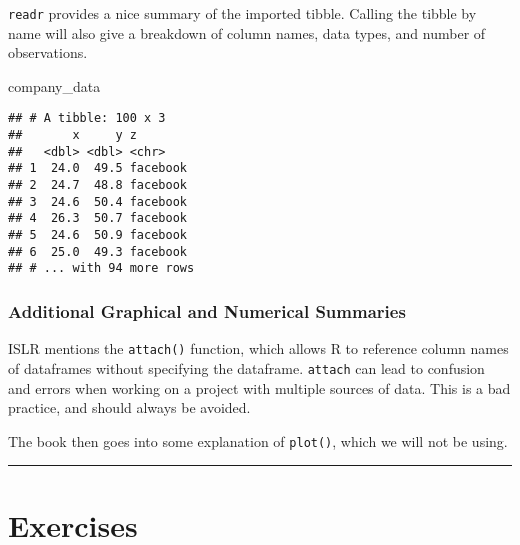 \documentclass[]{book}
\newenvironment{Shaded}{\begin{snugshade}}{\end{snugshade}}
\newcommand{\NormalTok}[1]{#1}
\theoremstyle{definition}
\theoremstyle{definition}
\theoremstyle{definition}
\theoremstyle{remark}
\begin{document}
\texttt{readr} provides a nice summary of the imported tibble. Calling
the tibble by name will also give a breakdown of column names, data
types, and number of observations.

\begin{Shaded}
\begin{Highlighting}[]
\NormalTok{company_data}
\end{Highlighting}
\end{Shaded}

\begin{verbatim}
## # A tibble: 100 x 3
##       x     y z       
##   <dbl> <dbl> <chr>   
## 1  24.0  49.5 facebook
## 2  24.7  48.8 facebook
## 3  24.6  50.4 facebook
## 4  26.3  50.7 facebook
## 5  24.6  50.9 facebook
## 6  25.0  49.3 facebook
## # ... with 94 more rows
\end{verbatim}

\subsubsection{Additional Graphical and Numerical
Summaries}\label{additional-graphical-and-numerical-summaries}

ISLR mentions the \texttt{attach()} function, which allows R to
reference column names of dataframes without specifying the dataframe.
\texttt{attach} can lead to confusion and errors when working on a
project with multiple sources of data. This is a bad practice, and
should always be avoided.

The book then goes into some explanation of \texttt{plot()}, which we
will not be using.

\begin{center}\rule{0.5\linewidth}{\linethickness}\end{center}

\section{Exercises}\label{exercises}
\end{document}
